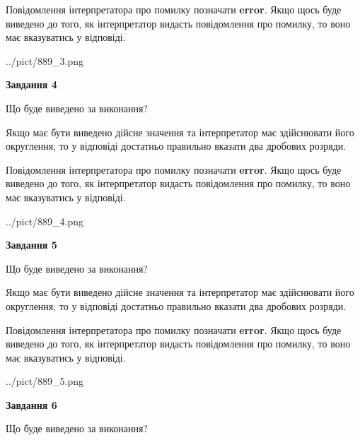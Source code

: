 \documentclass[12pt, ukrainian]{article}
\begin{document}
{\begin {Large}
Повідомлення інтерпретатора про помилку позначати \textbf{error}.
Якщо щось буде виведено до того, як інтерпретатор видасть повідомлення про помилку, 
то воно має вказуватись у відповіді. \par

\begin{center}
	{../pict/889_3.png}
\end{center}
\newpage

{\begin {center}\textbf{Завдання 4}\end {center}}\par
Що буде виведено за виконання? \par

Якщо має бути виведено дійсне значення та інтерпретатор має здійснювати його округлення, 
то у відповіді достатньо правильно вказати два дробових розряди.

Повідомлення інтерпретатора про помилку позначати \textbf{error}.
Якщо щось буде виведено до того, як інтерпретатор видасть повідомлення про помилку, 
то воно має вказуватись у відповіді. \par

\begin{center}
	{../pict/889_4.png}
\end{center}
\newpage

{\begin {center}\textbf{Завдання 5}\end {center}}\par
Що буде виведено за виконання? \par

Якщо має бути виведено дійсне значення та інтерпретатор має здійснювати його округлення, 
то у відповіді достатньо правильно вказати два дробових розряди.

Повідомлення інтерпретатора про помилку позначати \textbf{error}.
Якщо щось буде виведено до того, як інтерпретатор видасть повідомлення про помилку, 
то воно має вказуватись у відповіді. \par

\begin{center}
	{../pict/889_5.png}
\end{center}
\newpage

{\begin {center}\textbf{Завдання 6}\end {center}}\par
Що буде виведено за виконання? \par


\end{Large}}
\end{document}
